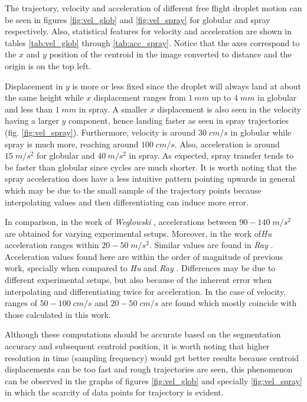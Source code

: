 The trajectory, velocity and acceleration of different free flight droplet motion can be seen in figures \ref{fig:vel_glob} and \ref{fig:vel_spray} for globular and spray respectively. Also, statistical features for velocity and acceleration are shown in tables \ref{tab:vel_glob} through \ref{tab:acc_spray}. Notice that the axes correspond to the $x$ and $y$ position of the centroid in the image converted to distance and the origin is on the top left. 

Displacement in $y$ is more or less fixed since the droplet will always land at about the same height while $x$ displacement ranges from $1\:mm$ up to $4\;mm$ in globular and less than $1\;mm$ in spray. A smaller $x$ displacement is also seen in the velocity having a larger $y$ component, hence landing faster as seen in spray trajectories (fig. \ref{fig:vel_spray}). Furthermore, velocity is around $30\;cm/s$ in globular while spray is much more, reaching around $100\;cm/s$. Also, acceleration is around $15\;m/s^2$ for globular and $40\:m/s^2$ in spray. As expected, spray transfer tends to be faster than globular since cycles are much shorter. It is worth noting that the spray acceleration does have a less intuitive pattern pointing upwards in general which may be due to the small sample of the trajectory points because interpolating values and then differentiating can induce more error.

In comparison, in the work of \textit{Weglowski} \cite{vel}, accelerations between $90-140 \;m/s^2$ are obtained for varying experimental setups. Moreover, in the work of\textit{Hu} \cite{vel2} acceleration ranges within $20-50\;m/s^2$. Similar values are found in \textit{Ray} \cite{Ray}. Acceleration values found here are within the order of magnitude of previous work, specially when compared to \textit{Hu} and \textit{Ray} \cite{vel2,Ray}. Differences may be due to different experimental setups, but also because of the inherent error when interpolating and differentiating twice for acceleration. In the case of velocity, ranges of $50-100\;cm/s$ and $20-50\;cm/s$ are found \cite{vel,vel2} which mostly coincide with those calculated in this work.

Although these computations should be accurate based on the segmentation accuracy and subsequent centroid position, it is worth noting that higher resolution in time (sampling frequency) would get better results because centroid displacements can be too fast and rough trajectories are seen, this phenomenon can be observed in the graphs of figures \ref{fig:vel_glob} and specially \ref{fig:vel_spray} in which the scarcity of data points for trajectory is evident.

